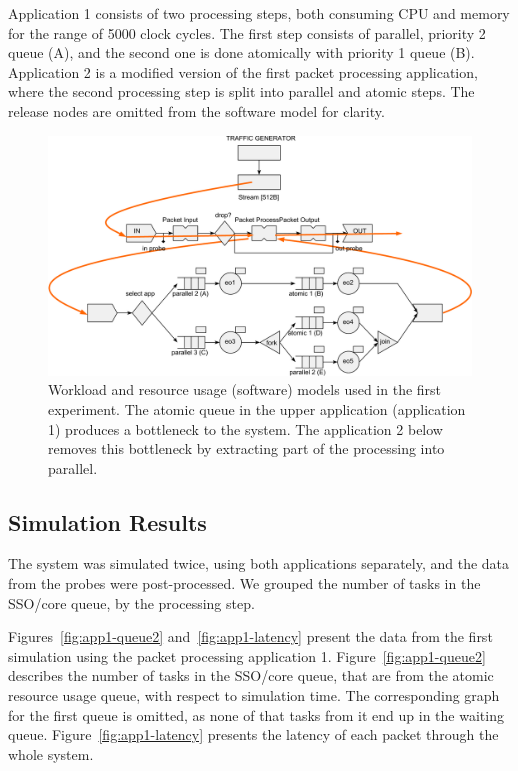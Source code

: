Application 1 consists of two processing steps, both consuming CPU and memory for the range of 5000 clock cycles. The first step consists of parallel, priority 2 queue (A), and the second one is done atomically with priority 1 queue (B). Application 2 is a modified version of the first packet processing application, where the second processing step is split into parallel and atomic steps. The release nodes are omitted from the software model for clarity.

\begin{figure}[]
  \begin{center}
    \includegraphics[width=\textwidth]{images/pse-models/exp1-software.pdf}
    \caption{Workload and resource usage (software) models used in the first experiment. The atomic queue in the upper application (application 1) produces a bottleneck to the system. The application 2 below removes this bottleneck by extracting part of the processing into parallel.}
    \label{fig:exp1-software}
  \end{center}
\end{figure}

\subsection{Simulation Results}
\label{sec:exp1-simulation-results}
The system was simulated twice, using both applications separately, and the data from the probes were post-processed. We grouped the number of tasks in the SSO/core queue, by the processing step.

Figures~\ref{fig:app1-queue2} and~\ref{fig:app1-latency} present the data from the first simulation using the packet processing application 1. Figure~\ref{fig:app1-queue2} describes the number of tasks in the SSO/core queue, that are from the atomic resource usage queue, with respect to simulation time. The corresponding graph for the first queue is omitted, as none of that tasks from it end up in the waiting queue. Figure~\ref{fig:app1-latency} presents the latency of each packet through the whole system.

